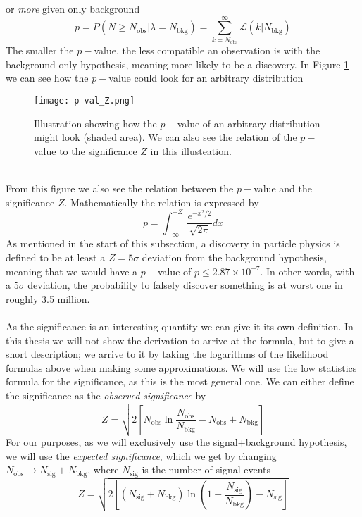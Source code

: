 \documentclass[12pt, a4paper]{book}
\begin{document}
or \textit{more} given only background
\begin{equation}\label{eq:p-value}
    p = P(N\ge N_{\text{obs}}\vert \lambda = N_{\text{bkg}}) = \sum_{k=N_{\text{obs}}}^{\infty}\mathcal{L}(k\vert N_{\text{bkg}})
\end{equation}
The smaller the $p-$value, the less compatible an observation is with the background only hypothesis, meaning more likely to be a discovery. In Figure \ref{fig:p-val} we can see how the $p-$value could look for an arbitrary distribution
\begin{figure}[!ht]
    \centering
    \texttt{[image: p-val\_Z.png]}
    \caption[$p-$value and significance $Z$ relation]{Illustration showing how the $p-$value of an arbitrary distribution might look (shaded area). We can also see the relation of the $p-$value to the significance $Z$ in this illusteation.}\label{fig:p-val}
\end{figure}
\\From this figure we also see the relation between the $p-$value and the significance $Z$. Mathematically the relation is expressed by
$$
    p = \int_{-\infty}^{-Z} \frac{e^{-x^2/2}}{\sqrt{2\pi}}dx
$$
As mentioned in the start of this subsection, a discovery in particle physics is defined to be at least a $Z=5\sigma$ deviation from the background hypothesis, meaning that we would have a $p-$value of $p\le2.87\times10^{-7}$. In other words, with a $5\sigma$ deviation, the probability to 
falsely discover something is at worst one in roughly 3.5 million.\\ 
\\As the significance is an interesting quantity we can give it its own definition. In this thesis we will not show the derivation to arrive at the formula, but to give a short description; we arrive to it by taking the logarithms of the likelihood formulas above when making some approximations.  We will use the low statistics formula for the significance, 
as this is the most general one. We can either define the significance as the \textit{observed significance} by
$$
    Z = \sqrt{2\left[N_{\text{obs}}\ln\frac{N_{\text{obs}}}{N_{\text{bkg}}}-N_{\text{obs}}+N_{\text{bkg}}\right]}
$$
For our purposes, as we will exclusively use the signal+background hypothesis, we will use the \textit{expected significance}, which we get by changing $N_{\text{obs}} \rightarrow N_{\text{sig}}+N_{\text{bkg}}$, where $N_{\text{sig}}$ is the number of signal events
\begin{equation}\label{eq:exp_sig}
    Z = \sqrt{2\left[(N_{\text{sig}}+N_{\text{bkg}})\ln\left(1+\frac{N_{\text{sig}}}{N_{\text{bkg}}}\right)-N_{\text{sig}}\right]}
\end{equation}
\end{document}

